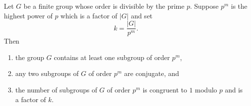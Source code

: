\documentclass{article}
\begin{document}
Let $G$ be a finite group whose order is divisible by the prime $p$. Suppose $p^m$ is the highest power of $p$ which is a factor of $|G|$ and set $$k = \frac{|G|}{p^m}.$$ Then

\begin{enumerate}
\item the group $G$ contains at least one subgroup of order $p^m$,
\item any two subgroups of $G$ of order $p^m$ are conjugate, and
\item the number of subgroups of $G$ of order $p^m$ is congruent to $1$ modulo $p$ and is a factor of $k$.
\end{enumerate}
\end{document}

